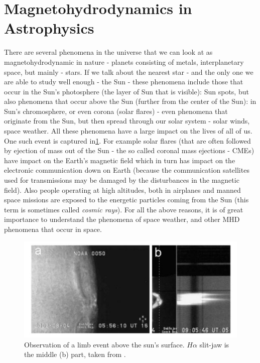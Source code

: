 \documentclass[journal,transmag]{IEEEtran}
\begin{document}
\section{Magnetohydrodynamics in Astrophysics}
There are several phenomena in the universe that we can look at as magnetohydrodynamic in nature - planets consisting of metals, interplanetary space, but mainly - stars. If we talk about the nearest star - and the only one we are able to study well enough - the Sun - these phenomena include those that occur in the Sun's photosphere (the layer of Sun that is visible): Sun spots, but also phenomena that occur above the Sun (further from the center of the Sun): in Sun's chromosphere, or even corona (solar flares) - even phenomena that originate from the Sun, but then spread through our solar system - solar winds, space weather. All these phenomena have a large impact on the lives of all of us. One such event is captured in\ref{figure:observation}. For example solar flares (that are often followed by ejection of mass out of the Sun - the so called coronal mass ejections - CMEs) have impact on the Earth's magnetic field which in turn has impact on the electronic communication down on Earth (because the communication satellites used for transmissions may be damaged by the disturbances in the magnetic field). Also people operating at high altitudes, both in airplanes and manned space missions are exposed to the energetic particles coming from the Sun (this term is sometimes called \textit{cosmic rays}). For all the above reasons, it is of great importance to understand the phenomena of space weather, and other MHD phenomena that occur in space.
\begin{figure}[!h]
\centering
\includegraphics[width=1.0\columnwidth]{figure2fromHalpha.jpg}
\caption{Observation of a limb event above the sun's surface. $H\alpha$ slit-jaw is the middle (b) part, taken from \cite{miraClanek}.}
\label{figure:observation}
\end{figure}
\end{document}
